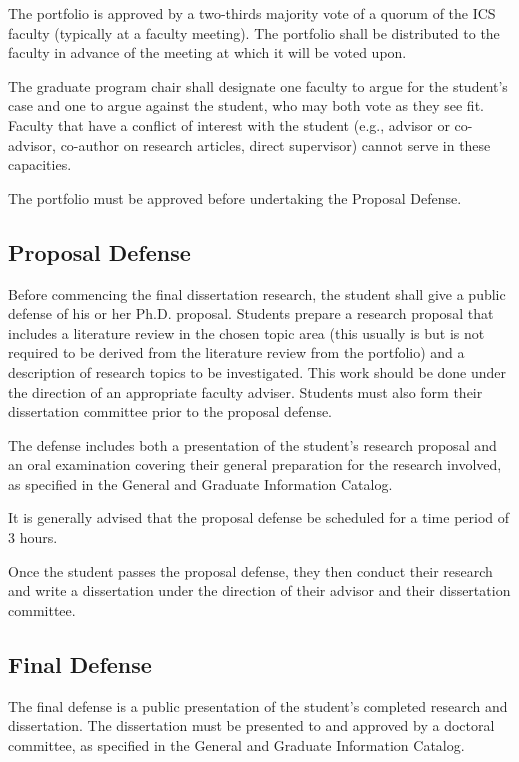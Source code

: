 \documentclass[12pt]{article}
\begin{document}
The portfolio is approved by a two-thirds majority vote of a quorum of the ICS faculty (typically at a faculty meeting). The portfolio shall be distributed to the faculty in advance of the meeting at which it will be voted upon.

The graduate program chair shall designate one faculty to argue for the student's case and one to argue against the student, who may both vote as they see fit. Faculty that have a conflict of interest with the student (e.g., advisor or co-advisor, co-author on research articles, direct supervisor) cannot serve in these capacities.

The portfolio must be approved before undertaking the Proposal Defense.

\subsection*{Proposal Defense}

Before commencing the final dissertation research, the student shall give a
public defense of his or her Ph.D. proposal. Students prepare a research
proposal that includes a literature review in the chosen topic area (this
usually is but is not required to be derived from the literature review
from the portfolio) and a description of research topics to be
investigated. This work should be done under the direction of an
appropriate faculty adviser.  Students must also form their dissertation
committee prior to the proposal defense.

The defense includes both a presentation of the student's research
proposal and an oral examination covering their general preparation for the
research involved, as specified in the General and Graduate Information
Catalog.

It is generally advised that the proposal defense be scheduled for a time period of 3 hours. 

Once the student passes the proposal defense, they then conduct their
research and write a dissertation under the direction of their advisor and
their dissertation committee.

\subsection*{Final Defense}

The final defense is a public presentation of the student's completed
research and dissertation.  The dissertation must be presented to and
approved by a doctoral committee, as specified in the General and Graduate
Information Catalog.
\end{document}
